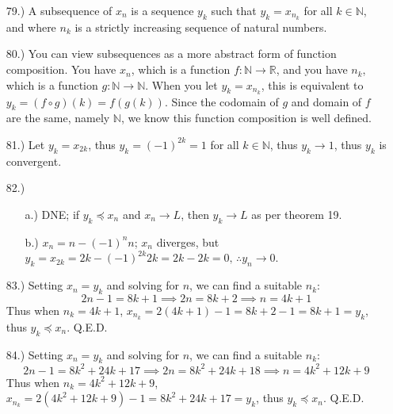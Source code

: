 \documentclass[12pt]{article}
\begin{document}
\begin{itemize}
    \item [79.)] A subsequence of $x_n$ is a sequence $y_k$ such that $y_k=x_{n_k}$ for all $k\in\mathbb{N}$, and where $n_k$ is a strictly increasing sequence of natural numbers.

    \item [80.)] You can view subsequences as a more abstract form of function composition. You have $x_n$, which is a function $f:\mathbb{N}\to\mathbb{R}$, and you have $n_k$, which is a function $g:\mathbb{N}\to\mathbb{N}$. When you let $y_k=x_{n_k}$, this is equivalent to $y_k=(f\circ g)(k)=f(g(k))$. Since the codomain of $g$ and domain of $f$ are the same, namely $\mathbb{N}$, we know this function composition is well defined.

    \item [81.)] Let $y_k=x_{2k}$, thus $y_k=(-1)^{2k}=1$ for all $k\in\mathbb{N}$, thus $y_k\to1$, thus $y_k$ is convergent.

    \item [82.)] \begin{itemize}
        \item [a.)] DNE; if $y_k\preceq x_n$ and $x_n\to L$, then $y_k\to L$ as per theorem 19.

        \item [b.)] $x_n=n-(-1)^nn$; $x_n$ diverges, but $y_k=x_{2k}=2k-(-1)^{2k}2k=2k-2k=0,\,\therefore y_n\to0$.

    \end{itemize}

    \item [83.)] Setting $x_n=y_k$ and solving for $n$, we can find a suitable $n_k$:
    \[2n-1=8k+1\implies2n=8k+2\implies n=4k+1\]
    Thus when $n_k=4k+1$, $x_{n_k}=2(4k+1)-1=8k+2-1=8k+1=y_k$, thus $y_k\preceq x_n$. Q.E.D.

    \item [84.)] Setting $x_n=y_k$ and solving for $n$, we can find a suitable $n_k$:
    \[2n-1=8k^2+24k+17\implies2n=8k^2+24k+18\implies n=4k^2+12k+9\]
    Thus when $n_k=4k^2+12k+9$, $x_{n_k}=2(4k^2+12k+9)-1=8k^2+24k+17=y_k$, thus $y_k\preceq x_n$. Q.E.D.




\end{itemize}
\end{document}
